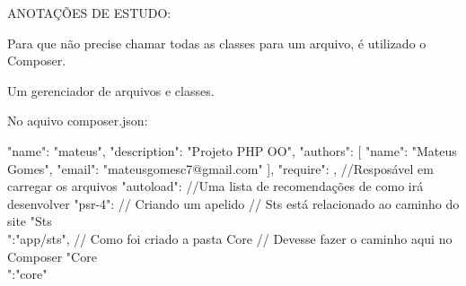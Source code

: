 ANOTAÇÕES DE ESTUDO:

Para que não precise chamar todas as classes para um arquivo, é utilizado o Composer.

Um gerenciador de arquivos e classes.

No aquivo composer.json:

{
    "name": "mateus",
    "description": "Projeto PHP OO",
    "authors": [
        {
            "name": "Mateus Gomes",
            "email": "mateusgomesc7@gmail.com"
        }
    ],
    "require": {},
    //Resposável em carregar os arquivos
    "autoload": { 
        //Uma lista de recomendações de como irá desenvolver
        "psr-4": {
            // Criando um apelido
            // Sts está relacionado ao caminho do site
            "Sts\\":"app/sts",
            // Como foi criado a pasta Core
            // Devesse fazer o caminho aqui no Composer
            "Core\\":"core"
        }
    }
}
